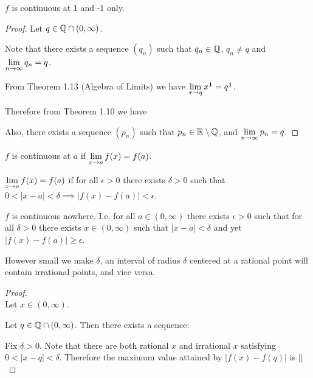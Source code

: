 \begin{theorem*}
  $f$ is continuous at 1 and -1 only.
\end{theorem*}

\begin{proof} Let $q \in \Q \cap (0, \infty)$.

  Note that there exists a sequence $(q_n)$ such that $q_n \in \Q$, $q_n \neq q$ and
  $\LimEq{q_n}{q}{n}{\infty}$.

  From Theorem 1.13 (Algebra of Limits) we have $\Lim{x^\1}{x}{q} = q^\1$.

  Therefore from Theorem 1.10 we have


  Also, there exists a sequence $(p_n)$ such that $p_n \in \R\setminus\Q$, and
  $\LimEq{p_n}{q}{n}{\infty}$.


\end{proof}

\begin{definition*}[continuity]
  $f$ is continuous at $a$ if $\LimEq{f(x)}{f(a)}{x}{a}$.
\end{definition*}

\begin{definition*}[limit]
  $\LimEq{f(x)}{f(a)}{x}{a}$ if for all $\epsilon > 0$ there exists $\delta > 0$ such that
  $0 < |x - a| < \delta \implies |f(x) - f(a)| < \epsilon$.
\end{definition*}

\begin{theorem*}
  $f$ is continuous nowhere. I.e. for all $a \in (0, \infty)$ there exists $\epsilon > 0$ such that
  for all $\delta > 0$ there exists $x \in (0, \infty)$ such that $|x - a| < \delta$ and yet
  $|f(x) - f(a)| \geq \epsilon$.
\end{theorem*}

\begin{intuition*}
  However small we make $\delta$, an interval of radius $\delta$ centered at a rational point will
  contain irrational points, and vice versa.
\end{intuition*}

\begin{proof}~\\
  Let $x \in (0, \infty)$.

  Let $q \in \Q \cap (0, \infty)$. Then there exists a sequence:




  Fix $\delta > 0$. Note that there are both rational $x$ and
  irrational $x$ satisfying $0 < |x - q| < \delta$. Therefore the maximum value attained by
  $|f(x) - f(q)|$ is $||$
\end{proof}



